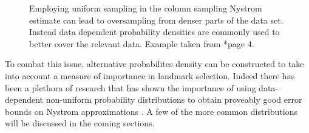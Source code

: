 \begin{figure}[h]
{\begin{adjustbox}{width=0.4\textwidth}
        \end{adjustbox}
    }
    \caption{Employing uniform sampling in the column sampling Nystrom estimate can lead to oversampling from denser parts of the data set. Instead data dependent probability densities are commonly used to better cover the relevant data. Example taken from \cite{musco2017recursive}*{page 4}.}
    \label{fig: uni-samp-v-nonuni-samp}
\end{figure}
To combat this issue, alternative probabilites density can be constructed to take into account a measure of importance in landmark selection. Indeed there has been a plethora of research that has shown the importance of using data-dependent non-uniform probability distributions to obtain proveably good error bounds on Nystrom approximations \cite{JMLR:v6:drineas05a,DBLP:journals/corr/abs-1303-1849,musco2017recursive,DBLP:journals/corr/abs-1109-3843,DBLP:journals/corr/CohenMM15,kumar2009sampling}. A few of the more common distributions will be discussed in the coming sections.